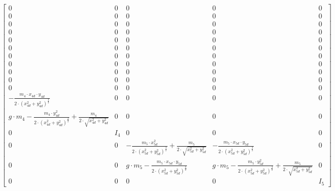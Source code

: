 $$\left[\begin{matrix}0 & 0 & 0 & 0 & 0\\0 & 0 & 0 & 0 & 0\\0 & 0 & 0 & 0 & 0\\0 & 0 & 0 & 0 & 0\\0 & 0 & 0 & 0 & 0\\0 & 0 & 0 & 0 & 0\\0 & 0 & 0 & 0 & 0\\0 & 0 & 0 & 0 & 0\\0 & 0 & 0 & 0 & 0\\0 & 0 & 0 & 0 & 0\\0 & 0 & 0 & 0 & 0\\- \frac{m_{4} \cdot x_{4 d} \cdot y_{4 d}}{2 \cdot \left(x_{4 d}^{2} + y_{4 d}^{2}\right)^{\frac{3}{2}}} & 0 & 0 & 0 & 0\\g \cdot m_{4} - \frac{m_{4} \cdot y_{4 d}^{2}}{2 \cdot \left(x_{4 d}^{2} + y_{4 d}^{2}\right)^{\frac{3}{2}}} + \frac{m_{4}}{2 \cdot \sqrt{x_{4 d}^{2} + y_{4 d}^{2}}} & 0 & 0 & 0 & 0\\0 & I_{4} & 0 & 0 & 0\\0 & 0 & - \frac{m_{5} \cdot x_{5 d}^{2}}{2 \cdot \left(x_{5 d}^{2} + y_{5 d}^{2}\right)^{\frac{3}{2}}} + \frac{m_{5}}{2 \cdot \sqrt{x_{5 d}^{2} + y_{5 d}^{2}}} & - \frac{m_{5} \cdot x_{5 d} \cdot y_{5 d}}{2 \cdot \left(x_{5 d}^{2} + y_{5 d}^{2}\right)^{\frac{3}{2}}} & 0\\0 & 0 & g \cdot m_{5} - \frac{m_{5} \cdot x_{5 d} \cdot y_{5 d}}{2 \cdot \left(x_{5 d}^{2} + y_{5 d}^{2}\right)^{\frac{3}{2}}} & g \cdot m_{5} - \frac{m_{5} \cdot y_{5 d}^{2}}{2 \cdot \left(x_{5 d}^{2} + y_{5 d}^{2}\right)^{\frac{3}{2}}} + \frac{m_{5}}{2 \cdot \sqrt{x_{5 d}^{2} + y_{5 d}^{2}}} & 0\\0 & 0 & 0 & 0 & I_{5}\end{matrix}\right]$$


